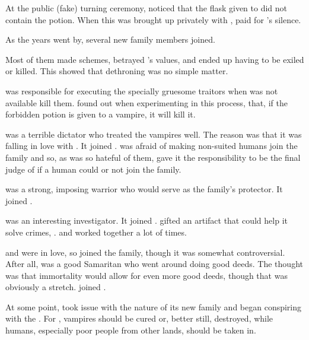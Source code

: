 At the public (fake) turning ceremony,  noticed that the flask given to  did not contain the potion. When this was brought up privately with ,  paid for 's silence.

As the years went by, several new family members joined.

Most of them made schemes, betrayed 's values, and ended up having to be exiled or killed. This showed  that dethroning  was no simple matter.

 was responsible for executing the specially gruesome traitors when  was not available kill them.  found out when experimenting in this process, that, if the forbidden potion is given to a vampire, it will kill it.

 was a terrible dictator who treated the vampires well. The reason was that it was falling in love with . It joined .  was afraid of making non-suited humans join the family and so, as  was so hateful of them, gave it the responsibility to be the final judge of if a human could or not join the family.

 was a strong, imposing warrior who would serve as the family's protector. It joined .

 was an interesting investigator. It joined .  gifted  an artifact that could help it solve crimes, .  and  worked together a lot of times.

 and  were in love, so  joined the family, though it was somewhat controversial. After all,  was a good Samaritan who went around doing good deeds. The thought was that immortality would allow for even more good deeds, though that was obviously a stretch.  joined .

At some point,  took issue with the nature of its new family and began conspiring with the . For , vampires should be cured or, better still, destroyed, while humans, especially poor people from other lands, should be taken in.

